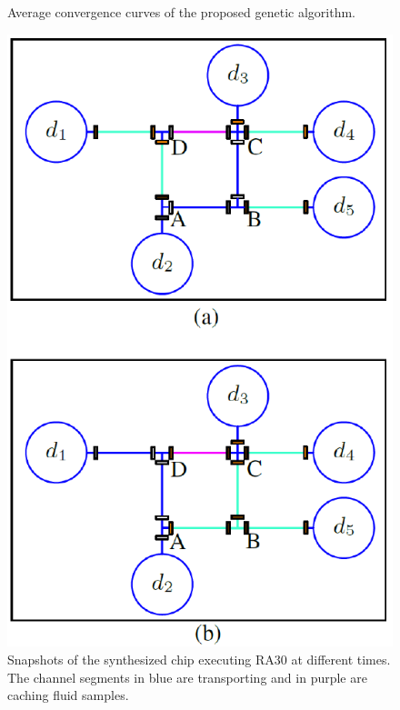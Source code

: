 \begin{figure}[t]
{
  \figurefontsize
\centering

%
\caption{Average convergence curves of the proposed genetic algorithm.}
\label{fig:iteration}
}
\end{figure}

\begin{figure}[t]
    \centering
    \includegraphics[width=0.6\linewidth]{Visio/RA30_exe_flow.pdf}
  \caption{Snapshots of the synthesized chip executing RA30 at different times. The channel segments in blue are transporting and in purple are caching fluid samples.}
      \label{fig:RA30_exe_1}
\end{figure}

